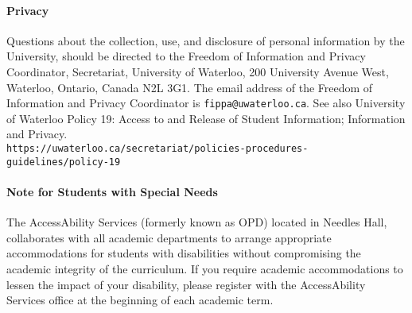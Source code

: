 \documentclass[letterpaper,10pt]{article}
\begin{document}
\paragraph{Privacy}
Questions about the collection, use, and disclosure of personal information by the University, should be directed to the Freedom of Information and Privacy Coordinator, Secretariat, University of Waterloo, 200 University Avenue West, Waterloo, Ontario, Canada N2L 3G1. The email address of the Freedom of Information and Privacy Coordinator is \texttt{fippa@uwaterloo.ca}. See also University of Waterloo Policy 19: Access to and Release of Student Information; Information and Privacy.
\\ \texttt{https://uwaterloo.ca/secretariat/policies-procedures-guidelines/policy-19}

\paragraph{Note for Students with Special Needs}
The AccessAbility Services (formerly known as OPD) located in Needles Hall, collaborates with all academic departments to arrange appropriate accommodations for students with disabilities without compromising the academic integrity of the curriculum. If you require academic accommodations to lessen the impact of your disability, please register with the AccessAbility Services office at the beginning of each academic term.
\end{document}
